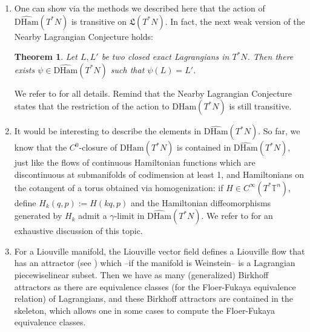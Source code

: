 \documentclass{article}
\newcommand{\1}{\mathbbm{1}}
\newtheorem{thm}{Theorem}[section]
\theoremstyle{remark}
\begin{document}
\begin{enumerate}
\item One can show via the methods we described here that the action of $\widehat{\mathrm{DHam}}(T^*N)$ is transitive on  $\mathfrak{L}(T^*N)$. In fact, the next weak version of the Nearby Lagrangian Conjecture holds:
\begin{thm}
Let $L,L'$ be two closed exact Lagrangians in $T^*N$. Then there exists $\psi \in \widehat{\mathrm{DHam}}(T^*N)$ such that $\psi(L) = L'$.  
\end{thm}
We refer to \cite[Section 7]{arnHumVit24} for all details. Remind that the Nearby Lagrangian Conjecture states that the restriction of the action to $\mathrm{DHam}(T^*N)$ is still transitive.
\item It would be interesting to describe the elements in $\widehat{\mathrm{DHam}}(T^*N)$. So far, we know that the $C^0$-closure of $\mathrm{DHam}(T^*N)$ is contained in $\widehat{\mathrm{DHam}}(T^*N)$, just like the flows of continuous Hamiltonian functions which are discontinuous at submanifolds of codimension at least 1, and Hamiltonians on the cotangent of a torus obtained via homogenization: if $H \in C^\infty(T^*\mathbb{T}^n)$, define $H_k(q, p):=H(kq, p)$ and the Hamiltonian diffeomorphisms generated by $H_k$ admit a $\gamma$-limit in $\widehat{\mathrm{DHam}}(T^*N)$. We refer to \cite{SymplHo} for an exhaustive discussion of this topic. 
\item For a Liouville manifold, the Liouville vector field defines a Liouville flow that has an attractor (see \cite{Biran-Skeleta}) which --if the manifold is Weinstein-- is a Lagrangian piecewiselinear subset. Then we have as many (generalized) Birkhoff attractors as there are equivalence classes (for the Floer-Fukaya equivalence relation) of Lagrangians, and these Birkhoff attractors are contained in the skeleton, which allows one in some cases to compute the Floer-Fukaya equivalence classes. 
\end{enumerate}
\printbibliography
\end{document}
